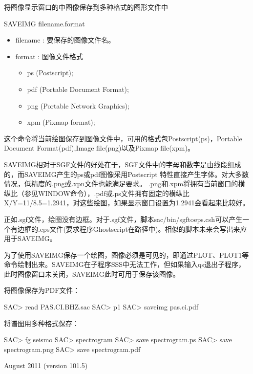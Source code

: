\label{cmd:saveimg}

将图像显示窗口的中图像保存到多种格式的图形文件中

SAVEIMG filename.format

\begin{itemize}
\item filename : 要保存的图像文件名。 
\item format : 图像文件格式
	\begin{itemize}
	\item ps  (Postscript); 
    \item pdf (Portable Document Format);
	\item png (Portable Network Graphics);
	\item xpm (Pixmap format);
	\end{itemize}
\end{itemize}

这个命令将当前绘图保存到图像文件中，可用的格式包Postscript(ps)，Portable Document Format(pdf),Image file(png)以及Pixmap file(xpm)。

SAVEIMG相对于SGF文件的好处在于，SGF文件中的字母和数字是由线段组成的，而SAVEIMG产生的ps或pdf图像采用Postscript 特性直接产生字体。对大多数情况，低精度的.png或.xpn文件也能满足要求。
.png和.xpm将拥有当前窗口的横纵比（参见WINDOW命令），.pdf或.ps文件拥有固定的横纵比X/Y=11/8.5=1.2941，对这些绘图，如果显示窗口设置为1.2941会看起来比较好。

正如.sgf文件，绘图没有边框。对于.sgf文件，脚本sac/bin/sgftoeps.csh可以产生一个有边框的.eps文件(要求程序Ghostscript在路径中)。相似的脚本未来会写出来应用于SAVEIMG。

为了使用SAVEIMG保存一个绘图，图像必须是可见的，即通过PLOT、PLOT1等命令绘制出来。SAVEIMG在子程序SSS中无法工作，但如果输入qs退出子程序，此时图像窗口未关闭，SAVEIMG此时可用于保存该图像。

将图像保存为PDF文件：
\begin{SACCode}
SAC> read PAS.CI.BHZ.sac
SAC> p1
SAC> saveimg pas.ci.pdf
\end{SACCode}

将谱图用多种格式保存：
\begin{SACCode}
SAC> fg seismo
SAC> spectrogram
SAC> save spectrogram.ps
SAC> save spectrogram.png
SAC> save spectrogram.pdf
\end{SACCode}

August 2011 (version 101.5) 
